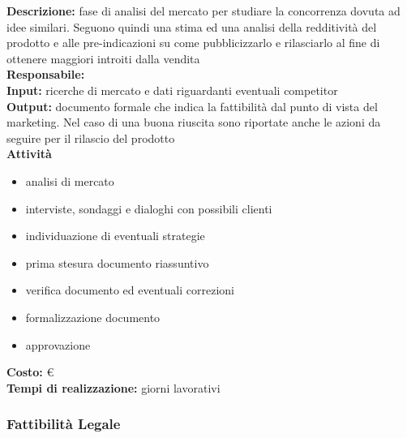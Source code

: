 \textbf{Descrizione:} fase di analisi del mercato per studiare la concorrenza dovuta ad idee similari. Seguono quindi una stima ed una analisi della redditività del prodotto e alle pre-indicazioni su come pubblicizzarlo e rilasciarlo al fine di ottenere maggiori introiti dalla vendita\\
\linebreak
\textbf{Responsabile:} \\
\linebreak
\textbf{Input:} ricerche di mercato e dati riguardanti eventuali competitor \\
\linebreak
\textbf{Output:} documento formale che indica la fattibilità dal punto di vista del marketing.
Nel caso di una buona riuscita sono riportate anche le azioni da seguire per
il rilascio del prodotto\\
\linebreak
\textbf{Attività}
\begin{itemize}
\item analisi di mercato
\item interviste, sondaggi e dialoghi con possibili clienti
\item individuazione di eventuali strategie
\item prima stesura documento riassuntivo
\item verifica documento ed eventuali correzioni
\item formalizzazione documento
\item approvazione
\end{itemize}
\textbf{Costo:} \euro \\
\textbf{Tempi di realizzazione:}  giorni lavorativi


\subsubsection{Fattibilità Legale}

